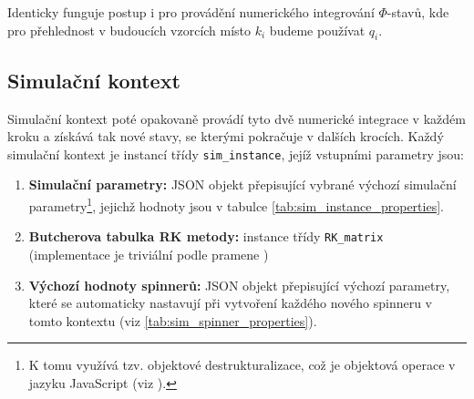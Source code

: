 Identicky funguje postup i pro provádění numerického integrování $\Phi$-stavů, kde pro přehlednost v budoucích vzorcích místo $k_i$ budeme používat $q_i$.

\subsection{Simulační kontext}

Simulační kontext poté opakovaně provádí tyto dvě numerické integrace v každém kroku a získává tak nové stavy, se kterými pokračuje v dalších krocích. Každý simulační kontext je instancí třídy \texttt{sim\_instance}, jejíž vstupními parametry jsou:
\begin{enumerate}
    \item \textbf{Simulační parametry:} JSON objekt přepisující vybrané výchozí simulační parametry\footnote{K tomu využívá tzv. objektové destrukturalizace, což je objektová operace v jazyku JavaScript (viz \cite{JS_deconstruction}).}, jejichž hodnoty jsou v tabulce \ref{tab:sim_instance_properties}.
    \item \textbf{Butcherova tabulka RK metody:} instance třídy \texttt{RK\_matrix} (implementace je triviální podle pramene \cite{Butcher_tab_def})
    \item \textbf{Výchozí hodnoty spinnerů:} JSON objekt přepisující výchozí parametry, které se automaticky nastavují při vytvoření každého nového spinneru v tomto kontextu (viz \autoref{tab:sim_spinner_properties}).
\end{enumerate}

\clearpage

